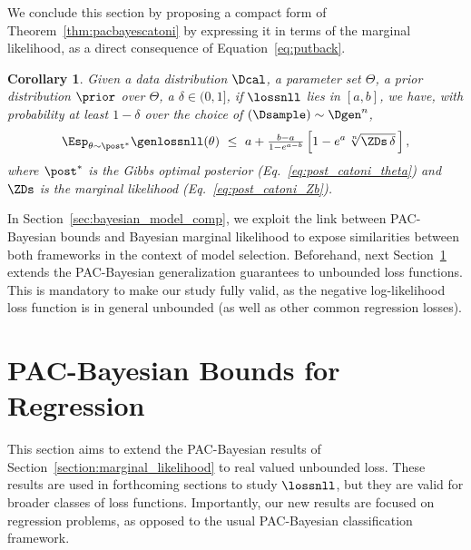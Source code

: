 \documentclass{article}
\newtheorem{cor}[thm]{Corollary}
\theoremstyle{definition}
\theoremstyle{plain}
\begin{document}
We conclude this section by proposing a compact form of Theorem~\ref{thm:pacbayescatoni} by expressing it in terms of the  marginal likelihood, 
as a direct consequence  of Equation~\eqref{eq:putback}. 
\begin{cor}%
	\label{thm:pacbayescatoni_maglike}
	Given a data distribution $\Dcal$, a parameter set $\Theta$,  a prior distribution $\prior$ over $\Theta$, a $\delta \in (0,1]$, if $\lossnll$ lies in $[a,b]$, we have, with probability at least $1 - \delta$ over the choice of  $(\Dsample) \sim  \Dgen^n $,
	\begin{equation*} %
	\Esp_{\theta\sim\post^*} \genlossnll(\theta) 
			\ \leq \ 
			a + \tfrac{ b-a}{1 - e^{a-b}} \left[ 1-e^a \,\sqrt[n]{\ZDs\,\delta}\,\right] ,
	\end{equation*}		
	where $\post^*$ is the Gibbs optimal posterior (Eq.~\ref{eq:post_catoni_theta}) 
	and $\ZDs$ is the marginal likelihood (Eq.~\ref{eq:post_catoni_Zb}).
\end{cor}
%
%
%
%
%
%
%
%
%
 In Section~\ref{sec:bayesian_model_comp}, we exploit the link between PAC-Bayesian bounds and Bayesian marginal likelihood to expose similarities between both frameworks in the context of model selection.
 Beforehand, next Section~\ref{sec:more-bounds} extends the PAC-Bayesian generalization guarantees to unbounded loss functions. This is mandatory to make our study fully valid, as  the negative log-likelihood loss function is in general unbounded (as well as other common regression losses).
 \section{PAC-Bayesian Bounds for Regression}
\label{sec:more-bounds}

This section aims to extend the PAC-Bayesian results of Section~\ref{section:marginal_likelihood} to real valued unbounded loss.
%
These results are used in forthcoming sections to study $\lossnll$, but they are valid  for broader classes of loss functions. 
Importantly, our new results are focused on regression problems, as opposed to the usual PAC-Bayesian classification framework. 
\end{document}
